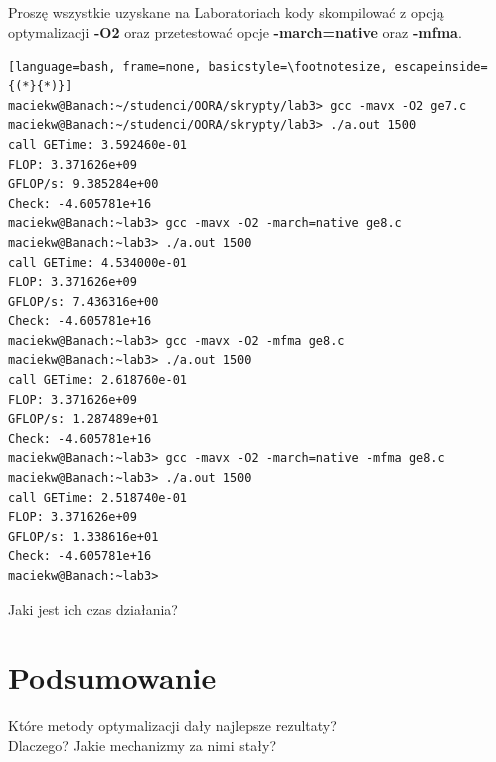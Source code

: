 \documentclass[12pt,a4paper]{article}
\begin{document}
\subsection{}

Proszę wszystkie uzyskane na Laboratoriach kody skompilować z opcją optymalizacji \textbf{-O2} oraz przetestować opcje \textbf{-march=native} oraz \textbf{-mfma}.
\begin{lstlisting}[language=bash, frame=none, basicstyle=\footnotesize, escapeinside={(*}{*)}]
maciekw@Banach:~/studenci/OORA/skrypty/lab3> gcc -mavx -O2 ge7.c 
maciekw@Banach:~/studenci/OORA/skrypty/lab3> ./a.out 1500
call GETime: 3.592460e-01
FLOP: 3.371626e+09
GFLOP/s: 9.385284e+00
Check: -4.605781e+16
maciekw@Banach:~lab3> gcc -mavx -O2 -march=native ge8.c
maciekw@Banach:~lab3> ./a.out 1500
call GETime: 4.534000e-01
FLOP: 3.371626e+09
GFLOP/s: 7.436316e+00
Check: -4.605781e+16
maciekw@Banach:~lab3> gcc -mavx -O2 -mfma ge8.c
maciekw@Banach:~lab3> ./a.out 1500
call GETime: 2.618760e-01
FLOP: 3.371626e+09
GFLOP/s: 1.287489e+01
Check: -4.605781e+16
maciekw@Banach:~lab3> gcc -mavx -O2 -march=native -mfma ge8.c
maciekw@Banach:~lab3> ./a.out 1500
call GETime: 2.518740e-01
FLOP: 3.371626e+09
GFLOP/s: 1.338616e+01
Check: -4.605781e+16
maciekw@Banach:~lab3>  
\end{lstlisting}
Jaki jest ich czas działania?




\section{Podsumowanie}

Które metody optymalizacji dały najlepsze rezultaty?\\
Dlaczego? Jakie mechanizmy za nimi stały?
\end{document}
